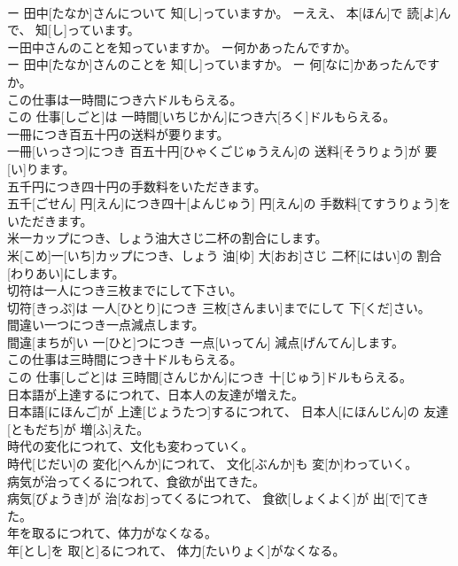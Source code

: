 \documentclass[8pt]{extreport}
\begin{document}
\begin{CJK}{UTF8}{min}
\\	ー 田中[たなか]さんについて 知[し]っていますか。 ーええ、 本[ほん]で 読[よ]んで、 知[し]っています。
\\	ー田中さんのことを知っていますか。 ー何かあったんですか。	
\\	ー 田中[たなか]さんのことを 知[し]っていますか。 ー 何[なに]かあったんですか。
\\	この仕事は一時間につき六ドルもらえる。	
\\	この 仕事[しごと]は 一時間[いちじかん]につき六[ろく]ドルもらえる。
\\	一冊につき百五十円の送料が要ります。	
\\	一冊[いっさつ]につき 百五十円[ひゃくごじゅうえん]の 送料[そうりょう]が 要[い]ります。
\\	五千円につき四十円の手数料をいただきます。	
\\	五千[ごせん] 円[えん]につき四十[よんじゅう] 円[えん]の 手数料[てすうりょう]をいただきます。
\\	米一カップにつき、しょう油大さじ二杯の割合にします。	
\\	米[こめ]一[いち]カップにつき、しょう 油[ゆ] 大[おお]さじ 二杯[にはい]の 割合[わりあい]にします。
\\	切符は一人につき三枚までにして下さい。	
\\	切符[きっぷ]は 一人[ひとり]につき 三枚[さんまい]までにして 下[くだ]さい。
\\	間違い一つにつき一点減点します。	
\\	間違[まちが]い 一[ひと]つにつき 一点[いってん] 減点[げんてん]します。
\\	この仕事は三時間につき十ドルもらえる。	
\\	この 仕事[しごと]は 三時間[さんじかん]につき 十[じゅう]ドルもらえる。
\\	日本語が上達するにつれて、日本人の友達が増えた。	
\\	日本語[にほんご]が 上達[じょうたつ]するにつれて、 日本人[にほんじん]の 友達[ともだち]が 増[ふ]えた。
\\	時代の変化につれて、文化も変わっていく。	
\\	時代[じだい]の 変化[へんか]につれて、 文化[ぶんか]も 変[か]わっていく。
\\	病気が治ってくるにつれて、食欲が出てきた。	
\\	病気[びょうき]が 治[なお]ってくるにつれて、 食欲[しょくよく]が 出[で]てきた。
\\	年を取るにつれて、体力がなくなる。	
\\	年[とし]を 取[と]るにつれて、 体力[たいりょく]がなくなる。

\end{CJK}
\end{document}
